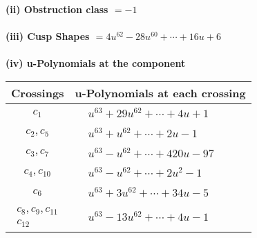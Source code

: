 \documentclass[1p]{elsarticle_modified}
\theoremstyle{definition}
\begin{document}
\flushleft \textbf{(ii) Obstruction class $= -1$}\\~\\
\flushleft \textbf{(iii) Cusp Shapes $= 4 u^{62}-28 u^{60}+\cdots+16 u+6$}\\~\\
\newpage\renewcommand{\arraystretch}{1}
\flushleft \textbf{(iv) u-Polynomials at the component}\newline \\
\begin{tabular}{m{50pt}|m{274pt}}
Crossings & \hspace{64pt}u-Polynomials at each crossing \\
\hline $$\begin{aligned}c_{1}\end{aligned}$$&$\begin{aligned}
&u^{63}+29 u^{62}+\cdots+4 u+1
\end{aligned}$\\
\hline $$\begin{aligned}c_{2},c_{5}\end{aligned}$$&$\begin{aligned}
&u^{63}+u^{62}+\cdots+2 u-1
\end{aligned}$\\
\hline $$\begin{aligned}c_{3},c_{7}\end{aligned}$$&$\begin{aligned}
&u^{63}- u^{62}+\cdots+420 u-97
\end{aligned}$\\
\hline $$\begin{aligned}c_{4},c_{10}\end{aligned}$$&$\begin{aligned}
&u^{63}- u^{62}+\cdots+2 u^2-1
\end{aligned}$\\
\hline $$\begin{aligned}c_{6}\end{aligned}$$&$\begin{aligned}
&u^{63}+3 u^{62}+\cdots+34 u-5
\end{aligned}$\\
\hline $$\begin{aligned}c_{8},c_{9},c_{11}\\c_{12}\end{aligned}$$&$\begin{aligned}
&u^{63}-13 u^{62}+\cdots+4 u-1
\end{aligned}$\\
\hline
\end{tabular}\\~\\
\end{document}
